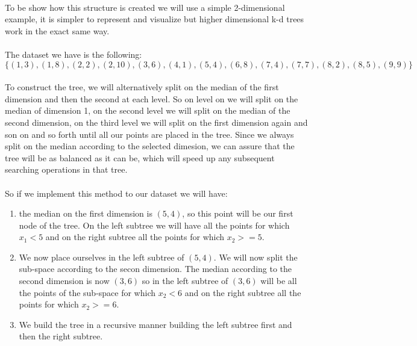 \documentclass[11 pt]{article}
\begin{document}
\paragraph{}To be show how this structure is created we will use a simple 2-dimensional example, it is simpler to represent and visualize but higher dimensional k-d trees work in the exact same way.
\paragraph{}The dataset we have is the following:
\begin{equation*}
  \{(1, 3),(1, 8), (2, 2), (2, 10), (3, 6), (4, 1), (5, 4), (6, 8), (7, 4), (7, 7), (8, 2), (8, 5), (9, 9)\}
\end{equation*}
\paragraph{}To construct the tree, we will alternatively split on the median of the first dimension and then the second at each level. So on level on we will split on the median of dimension 1, on the second level we will split on the median of the second dimension, on the third level we will split on the first dimension again and son on and so forth until all our points are placed in the tree. Since we always split on the median according to the selected dimesion, we can assure that the tree will be as balanced as it can be, which will speed up any subsequent searching operations in that tree.
\paragraph{}So if we implement this method to our dataset we will have:\\
\begin{enumerate}
  \item the median on the first dimension is $(5,4)$, so this point will be our first node of the tree. On the left subtree we will have all the points for which $x_1<5$ and on the right subtree all the points for which $x_2>=5$.
  \item We now place ourselves in the left subtree of $(5,4)$. We will now split the sub-space according to the secon dimension. The median according to the second dimension is now $(3,6)$ so in the left subtree of $(3,6)$ will be all the points of the sub-space for which $x_2<6$ and on the right subtree all the points for which $x_2>=6$.
  \item We build the tree in a recursive manner building the left subtree first and then the right subtree.
\end{enumerate}
\end{document}

